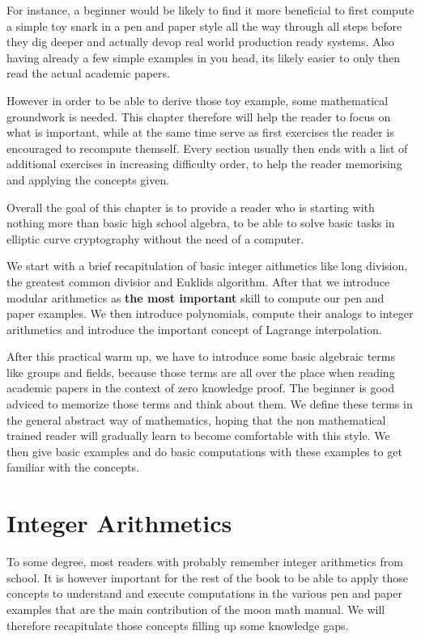 For instance, a beginner would be likely to find it more beneficial to first compute a simple toy snark in a pen and paper style all the way through all steps before they dig deeper and actually devop real world production ready systems. Also having already a few simple examples in you head, its likely easier to only then read the actual academic papers. 

However in order to be able to derive those toy example, some mathematical groundwork is needed. This chapter therefore will help the reader to focus on what is important, while at the same time serve as first exercises the reader is encouraged to recompute themself. Every section usually then ends with a list of additional exercises in increasing difficulty order, to help the reader memorising and applying the concepts given. 

Overall the goal of this chapter is to provide a reader who is starting with nothing more than basic high school algebra, to be able to solve basic tasks in elliptic curve cryptography without the need of a computer.


We start with a brief recapitulation of basic integer aithmetics like long division, the greatest common divisior and Euklids algorithm. After that we introduce modular arithmetics as \textbf{the most important} skill to compute our pen and paper examples. We then introduce polynomials, compute their analogs to integer arithmetics and introduce the important concept of Lagrange interpolation.

After this practical warm up, we have to introduce some basic algebraic terms like groups and fields, because those terms are all over the place when reading academic papers in the context of zero knowledge proof. The beginner is good adviced to memorize those terms and think about them. We define these terms in the general abstract way of mathematics, hoping that the non mathematical trained reader will gradually learn to become comfortable with this style. We then give basic examples and do basic computations with these examples to get familiar with the concepts. 

\section{Integer Arithmetics}
\label{integer_arithmetics}
To some degree, most readers with probably remember integer arithmetics from school. It is however important for the rest of the book to be able to apply those concepts to understand and execute computations in the various pen and paper examples that are the main contribution of the moon math manual. We will therefore recapitulate those concepts filling up some knowledge gaps.

